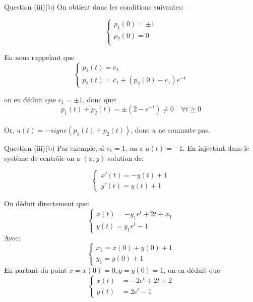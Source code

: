 \documentclass[11pt]{beamer}
\begin{document}
\begin{frame}{Question (iii)(b)}
On obtient donc les conditions suivantes:

$$
\left\{
\begin{array}{ll}
p_1(0) = \pm 1 \\
p_2(0) = 0 \\
\end{array}
\right.
$$

En nous rappelant que 
$$
\left\{
\begin{array}{ll}
p_1(t) = c_1 \\
p_2(t) = c_1 + (p_2(0)-c_1)e^{-t}
\end{array}
\right.
$$

on en déduit que $c_1=\pm 1$, donc que: $$p_1(t) + p_2(t) = \pm (2-e^{-t}) \neq 0 \quad \forall t \geq 0$$\\Or, $u(t)=-signe(p_1(t)+p_2(t))$, donc $u$ ne commute pas.
\end{frame}

\begin{frame}{Question (iii)(b)}
Par exemple, si $c_1 = 1$, on a $u(t)=-1$.\newline
En injectant dans le système de contrôle on a $(x,y)$ solution de:

$$
\left\{
\begin{array}{ll}
x'(t) = -y(t)+1 \\
y'(t) = y(t)+1
\end{array}
\right.
$$

On déduit directement que:
$$
\left\{
\begin{array}{ll}
x(t)= -y_1e^t  + 2t+ x_1 \\
y(t)=y_1e^t-1
\end{array}
\right.
$$
Avec:
$$
\left\{
\begin{array}{ll}
x_1= x(0)+y(0) +1 \\
y_1=y(0)+1
\end{array}
\right.
$$
En partant du point $x=x(0)=0,y=y(0)=1$, on en déduit que
$$
\left\{
\begin{array}{ll}
x(t) &= -2e^t +2 t+2 \\
y(t) &= 2e^t -1
\end{array} 
\right.
$$
\end{frame}
\end{document}
